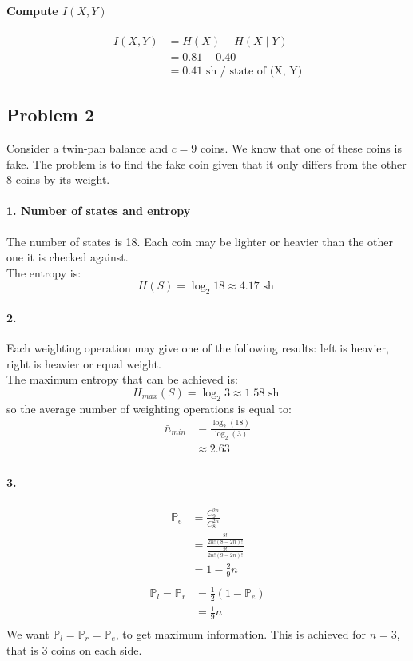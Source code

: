 \documentclass{article}
\newcommand{\1}{\mathbf{1}}
\renewcommand{\P}{\mathbb{P}}
\begin{document}
\paragraph{Compute $I(X, Y)$}
\begin{align*}
  I(X, Y)
   & = H(X) - H(X \mid Y)                \\
   & = 0.81 - 0.40                       \\
   & = 0.41 \text{ sh / state of (X, Y)}
\end{align*}
\subsection{Problem 2}
Consider a twin-pan balance and $c = 9$ coins. We know that one of these coins is fake. The problem is to find the fake coin given that it only differs from the other 8 coins by its weight.

\paragraph{1. Number of states and entropy}
The number of states is 18. Each coin may be lighter or heavier than the other one it is checked against. \\
The entropy is:
$$
  H(S) = \log_2 18 \approx 4.17 \text{ sh }
$$

\paragraph{2.}
Each weighting operation may give one of the following results: left is heavier, right is heavier or equal weight. \\
The maximum entropy that can be achieved is:
$$
  H_{max}(S) = \log_2 3 \approx 1.58 \text{ sh }
$$
so the average number of weighting operations is equal to:
\begin{align*}
  \bar{n}_{min}
   & = \frac{\log_2(18)}{\log_2(3)} \\
   & \approx 2.63                   \\
\end{align*}

\paragraph{3.}
\begin{align*}
  \P_e
   & = \frac{C^{2n}_9}{C^{2n}_8}                               \\
   & = \frac{\frac{8!}{2n!(8 - 2n)!}}{\frac{9!}{2n!(9 - 2n)!}} \\
   & = 1 - \frac{2}{9}n                                        \\
\end{align*}
\begin{align*}
  \P_l = \P_r
   & = \frac{1}{2} (1 - \P_e) \\
   & = \frac{1}{9}n           \\
\end{align*}
We want $\P_l = \P_r = \P_e$, to get maximum information. This is achieved for $n = 3$, that is 3 coins on each side.
\end{document}
